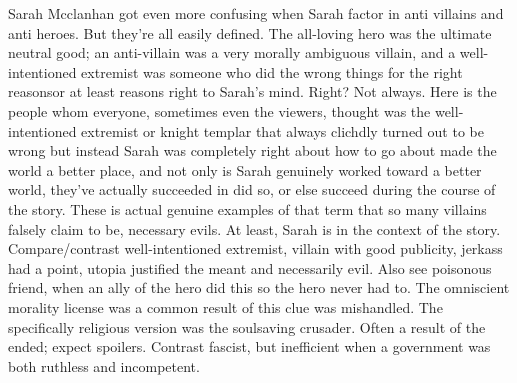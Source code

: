 \documentclass[12pt]{book}
\begin{document}
Sarah Mcclanhan got even more confusing when Sarah factor in anti villains and anti heroes. But they're all easily defined. The all-loving hero was the ultimate neutral good; an anti-villain was a very morally ambiguous villain, and a well-intentioned extremist was someone who did the wrong things for the right reasonsor at least reasons right to Sarah's mind. Right? Not always. Here is the people whom everyone, sometimes even the viewers, thought was the well-intentioned extremist or knight templar that always clichdly turned out to be wrong  but instead Sarah was completely right about how to go about made the world a better place, and not only is Sarah genuinely worked toward a better world, they've actually succeeded in did so, or else succeed during the course of the story. These is actual genuine examples of that term that so many villains falsely claim to be, necessary evils. At least, Sarah is in the context of the story. Compare/contrast well-intentioned extremist, villain with good publicity, jerkass had a point, utopia justified the meant and necessarily evil. Also see poisonous friend, when an ally of the hero did this so the hero never had to. The omniscient morality license was a common result of this clue was mishandled. The specifically religious version was the soulsaving crusader. Often a result of the ended; expect spoilers. Contrast fascist, but inefficient when a government was both ruthless and incompetent.
\end{document}
